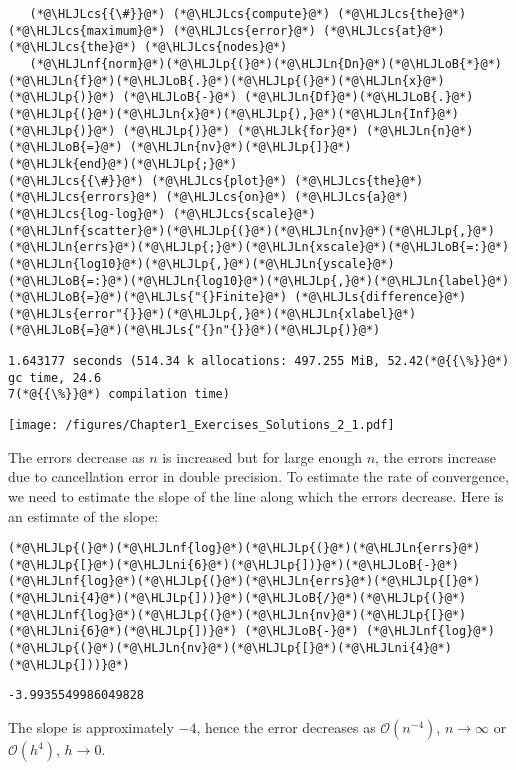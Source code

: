 \documentclass[12pt,a4paper]{article}
\newcommand{\HLJLk}[1]{\textcolor[RGB]{148,91,176}{\textbf{#1}}}
\newcommand{\HLJLn}[1]{#1}
\newcommand{\HLJLnf}[1]{\textcolor[RGB]{66,102,213}{#1}}
\newcommand{\HLJLs}[1]{\textcolor[RGB]{201,61,57}{#1}}
\newcommand{\HLJLni}[1]{\textcolor[RGB]{59,151,46}{#1}}
\newcommand{\HLJLoB}[1]{\textcolor[RGB]{102,102,102}{\textbf{#1}}}
\newcommand{\HLJLp}[1]{#1}
\newcommand{\HLJLcs}[1]{\textcolor[RGB]{153,153,119}{\textit{#1}}}
\begin{document}
\begin{lstlisting}
   (*@\HLJLcs{{\#}}@*) (*@\HLJLcs{compute}@*) (*@\HLJLcs{the}@*) (*@\HLJLcs{maximum}@*) (*@\HLJLcs{error}@*) (*@\HLJLcs{at}@*) (*@\HLJLcs{the}@*) (*@\HLJLcs{nodes}@*)
   (*@\HLJLnf{norm}@*)(*@\HLJLp{(}@*)(*@\HLJLn{Dn}@*)(*@\HLJLoB{*}@*)(*@\HLJLn{f}@*)(*@\HLJLoB{.}@*)(*@\HLJLp{(}@*)(*@\HLJLn{x}@*)(*@\HLJLp{)}@*) (*@\HLJLoB{-}@*) (*@\HLJLn{Df}@*)(*@\HLJLoB{.}@*)(*@\HLJLp{(}@*)(*@\HLJLn{x}@*)(*@\HLJLp{),}@*)(*@\HLJLn{Inf}@*)(*@\HLJLp{)}@*) (*@\HLJLp{)}@*) (*@\HLJLk{for}@*) (*@\HLJLn{n}@*) (*@\HLJLoB{=}@*) (*@\HLJLn{nv}@*)(*@\HLJLp{]}@*)
(*@\HLJLk{end}@*)(*@\HLJLp{;}@*)
(*@\HLJLcs{{\#}}@*) (*@\HLJLcs{plot}@*) (*@\HLJLcs{the}@*) (*@\HLJLcs{errors}@*) (*@\HLJLcs{on}@*) (*@\HLJLcs{a}@*) (*@\HLJLcs{log-log}@*) (*@\HLJLcs{scale}@*)
(*@\HLJLnf{scatter}@*)(*@\HLJLp{(}@*)(*@\HLJLn{nv}@*)(*@\HLJLp{,}@*)(*@\HLJLn{errs}@*)(*@\HLJLp{;}@*)(*@\HLJLn{xscale}@*)(*@\HLJLoB{=:}@*)(*@\HLJLn{log10}@*)(*@\HLJLp{,}@*)(*@\HLJLn{yscale}@*)(*@\HLJLoB{=:}@*)(*@\HLJLn{log10}@*)(*@\HLJLp{,}@*)(*@\HLJLn{label}@*)(*@\HLJLoB{=}@*)(*@\HLJLs{"{}Finite}@*) (*@\HLJLs{difference}@*) (*@\HLJLs{error"{}}@*)(*@\HLJLp{,}@*)(*@\HLJLn{xlabel}@*)(*@\HLJLoB{=}@*)(*@\HLJLs{"{}n"{}}@*)(*@\HLJLp{)}@*)
\end{lstlisting}

\begin{lstlisting}
1.643177 seconds (514.34 k allocations: 497.255 MiB, 52.42(*@{{\%}}@*) gc time, 24.6
7(*@{{\%}}@*) compilation time)
\end{lstlisting}

\texttt{[image: /figures/Chapter1\_Exercises\_Solutions\_2\_1.pdf]}

The errors decrease as $n$ is increased but for large enough $n$, the errors increase due to cancellation error in double precision.   To estimate the rate of convergence, we need to estimate the slope of the line along which the errors decrease.  Here is an estimate of the slope:


\begin{lstlisting}
(*@\HLJLp{(}@*)(*@\HLJLnf{log}@*)(*@\HLJLp{(}@*)(*@\HLJLn{errs}@*)(*@\HLJLp{[}@*)(*@\HLJLni{6}@*)(*@\HLJLp{])}@*)(*@\HLJLoB{-}@*)(*@\HLJLnf{log}@*)(*@\HLJLp{(}@*)(*@\HLJLn{errs}@*)(*@\HLJLp{[}@*)(*@\HLJLni{4}@*)(*@\HLJLp{]))}@*)(*@\HLJLoB{/}@*)(*@\HLJLp{(}@*)(*@\HLJLnf{log}@*)(*@\HLJLp{(}@*)(*@\HLJLn{nv}@*)(*@\HLJLp{[}@*)(*@\HLJLni{6}@*)(*@\HLJLp{])}@*) (*@\HLJLoB{-}@*) (*@\HLJLnf{log}@*)(*@\HLJLp{(}@*)(*@\HLJLn{nv}@*)(*@\HLJLp{[}@*)(*@\HLJLni{4}@*)(*@\HLJLp{]))}@*)
\end{lstlisting}

\begin{lstlisting}
-3.9935549986049828
\end{lstlisting}


The slope is approximately $-4$, hence the error decreases as $\mathcal{O}(n^{-4})$, $n \to \infty$ or $\mathcal{O}(h^{4})$, $h \to 0$.
\end{document}
